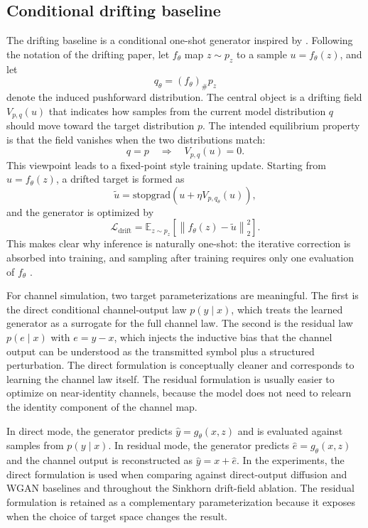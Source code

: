 \subsection{Conditional drifting baseline}
The drifting baseline is a conditional one-shot generator inspired by \cite{drifting}.
Following the notation of the drifting paper, let \(f_\theta\) map \(z \sim p_z\) to a sample \(u = f_\theta(z)\), and let
\begin{equation}
q_\theta = (f_\theta)_\# p_z
\end{equation}
denote the induced pushforward distribution.
The central object is a drifting field \(V_{p,q}(u)\) that indicates how samples from the current model distribution \(q\) should move toward the target distribution \(p\).
The intended equilibrium property is that the field vanishes when the two distributions match:
\begin{equation}
q = p
\quad \Longrightarrow \quad
V_{p,q}(u) = 0.
\end{equation}
This viewpoint leads to a fixed-point style training update.
Starting from \(u = f_\theta(z)\), a drifted target is formed as
\begin{equation}
\tilde{u}
=
\mathrm{stopgrad}\!\left(
u + \eta V_{p,q_\theta}(u)
\right),
\end{equation}
and the generator is optimized by
\begin{equation}
\mathcal{L}_{\text{drift}}
=
\mathbb{E}_{z \sim p_z}
\left[
\left\|
f_\theta(z) - \tilde{u}
\right\|_2^2
\right].
\end{equation}
This makes clear why inference is naturally one-shot: the iterative correction is absorbed into training, and sampling after training requires only one evaluation of \(f_\theta\) \cite{drifting}.

For channel simulation, two target parameterizations are meaningful.
The first is the direct conditional channel-output law \(p(y \mid x)\), which treats the learned generator as a surrogate for the full channel law.
The second is the residual law \(p(e \mid x)\) with \(e = y - x\), which injects the inductive bias that the channel output can be understood as the transmitted symbol plus a structured perturbation.
The direct formulation is conceptually cleaner and corresponds to learning the channel law itself.
The residual formulation is usually easier to optimize on near-identity channels, because the model does not need to relearn the identity component of the channel map.

In direct mode, the generator predicts \(\hat{y} = g_\theta(x, z)\) and is evaluated against samples from \(p(y \mid x)\).
In residual mode, the generator predicts \(\hat{e} = g_\theta(x, z)\) and the channel output is reconstructed as \(\hat{y} = x + \hat{e}\).
In the experiments, the direct formulation is used when comparing against direct-output diffusion and WGAN baselines and throughout the Sinkhorn drift-field ablation.
The residual formulation is retained as a complementary parameterization because it exposes when the choice of target space changes the result.

